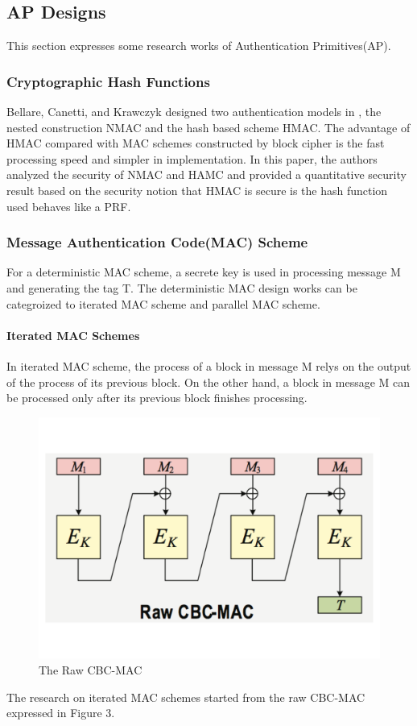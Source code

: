 \documentclass{article}
\begin{document}
\subsection{AP Designs} 
This section expresses some research works of Authentication Primitives(AP).
\subsubsection{Cryptographic Hash Functions}
Bellare, Canetti, and Krawczyk designed two authentication models in \cite{hmac}, the nested construction NMAC and the hash based scheme HMAC. The advantage of HMAC compared with MAC schemes constructed by block cipher is the fast processing speed and simpler in implementation. 
In this paper, the authors analyzed the security of NMAC and HAMC and provided a quantitative security result based on the security notion that HMAC is secure is the hash function used behaves like a PRF.  

\subsubsection{Message Authentication Code(MAC) Scheme}
For a deterministic MAC scheme, a secrete key is used in processing message M and generating the tag T. The deterministic MAC design works can be categroized to iterated MAC scheme and parallel MAC scheme.
\paragraph{Iterated MAC Schemes}
In iterated MAC scheme, the process of a block in message M relys on the output of the process of its previous block. On the other hand, a block in message M can be processed only after its previous block finishes processing. 

\begin{figure}[htbp]
\centering
\includegraphics[scale=0.3]{./diagrams/cbc-mac.pdf}
\caption{The Raw CBC-MAC}
\label{CBC-mac }
\end{figure}
The research on iterated MAC schemes started from the raw CBC-MAC expressed in Figure 3.
\end{document}

